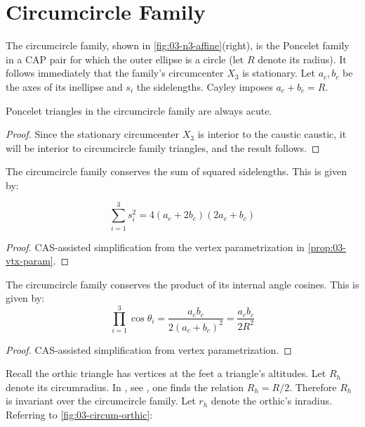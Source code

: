 \section{Circumcircle Family}

The circumcircle family, shown in \cref{fig:03-n3-affine}(right), is the Poncelet family in a CAP pair for which the outer ellipse is a circle (let $R$ denote its radius). It follows immediately that the family's circumcenter $X_3$ is stationary. Let $a_c,b_c$ be the axes of its inellipse and $s_i$ the sidelengths. Cayley imposes $a_c+b_c=R$.

\begin{lemma}
Poncelet triangles in the circumcircle family are always acute.
\label{lem:03-circum-acute}
\end{lemma}

\begin{proof}
Since the stationary circumcenter $X_3$ is interior to the caustic caustic, it will be interior to circumcircle family triangles, and the result follows.
\end{proof}

\begin{proposition}
The circumcircle family conserves the sum of squared sidelengths. This is given by:

\[ \sum_{i=1}^3 s_i^2=4(a_c + 2 b_c)(2 a_c + b_c) \]
\end{proposition}

\begin{proof}
CAS-assisted simplification from the vertex parametrization in \cref{prop:03-vtx-param}.
\end{proof}

\begin{proposition}
The circumcircle family conserves the product of its internal angle cosines. This is given by:
\[ \prod_{i=1}^3{\cos\theta_i}=\frac{a_c b_c}{2(a_c+b_c)^2}=\frac{a_c b_c}{2 R^2}\]
\label{prop:03-circum-cos-prod}
\end{proposition}

\begin{proof}
CAS-assisted simplification from vertex parametrization.
\end{proof}

Recall the orthic triangle has vertices at the feet a triangle's altitudes. Let $R_h$ denote its circumradius. In , see \cite[Orthic Triangle, Eqn 7]{mw}, one finds the relation $R_h=R/2$. Therefore $R_h$ is invariant over the circumcircle family. Let $r_h$ denote the orthic's inradius. Referring to \cref{fig:03-circum-orthic}:

